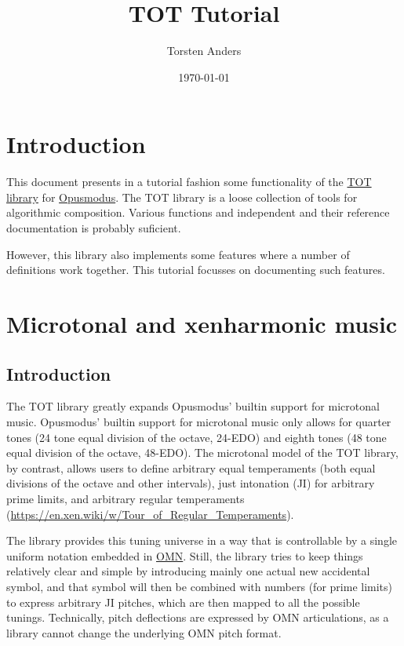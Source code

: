 \documentclass[11pt]{article}
\author{Torsten Anders}
\date{\today}
\title{TOT Tutorial}
\begin{document}
\maketitle
\setcounter{tocdepth}{4}
\tableofcontents


\section{Introduction}
\label{sec:org1f9dfaf}

This document presents in a tutorial fashion some functionality of the \href{https://github.com/tanders/tot}{TOT library} for
\href{http://opusmodus.com/}{Opusmodus}. The TOT library is a loose collection of tools for algorithmic composition. Various
functions and independent and their reference documentation is probably suficient. 

However, this library also implements some features where a number of definitions work
together. This tutorial focusses on documenting such features.


\section{Microtonal and xenharmonic music}
\label{sec:orged78377}

\subsection{Introduction}
\label{sec:org375ec40}

The TOT library greatly expands Opusmodus' builtin support for microtonal music.  Opusmodus'
builtin support for microtonal music only allows for quarter tones (24 tone equal division of
the octave, 24-EDO) and eighth tones (48 tone equal division of the octave, 48-EDO). The
microtonal model of the TOT library, by contrast, allows users to define arbitrary equal
temperaments (both equal divisions of the octave and other intervals), just intonation (JI) for
arbitrary prime limits, and arbitrary regular temperaments
(\url{https://en.xen.wiki/w/Tour\_of\_Regular\_Temperaments}). 

The library provides this tuning universe in a way that is controllable by a single uniform
notation embedded in \href{https://opusmodus.com/forums/tutorials/omn-the-language/}{OMN}. Still, the library tries to keep things relatively clear and simple by
introducing mainly one actual new accidental symbol, and that symbol will then be combined with
numbers (for prime limits) to express arbitrary JI pitches, which are then mapped to all the
possible tunings.  Technically, pitch deflections are expressed by OMN articulations, as a
library cannot change the underlying OMN pitch format.
\end{document}
